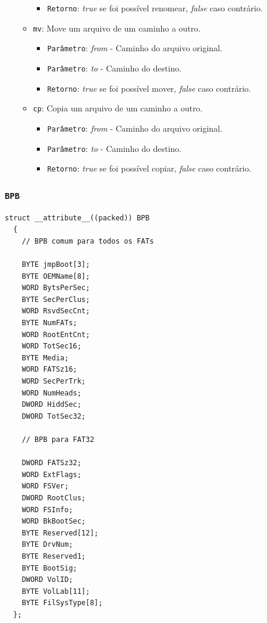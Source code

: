 \documentclass[
    12pt,				%
    oneside,   	        %
    a4paper,			%
    english,			%
    french,				%
    spanish,			%
    brazil,				%
    ]{pacotes/abntex2}
\begin{document}
\begin{itemize}
\begin{itemize}
\begin{itemize}
                \item \texttt{Retorno}: \textit{true} se foi possível renomear, \textit{false} caso contrário.
            \end{itemize}
            \item \texttt{mv}: Move um arquivo de um caminho a outro.
            \begin{itemize}
                \item \texttt{Parâmetro}: \textit{from} - Caminho do arquivo original.
                \item \texttt{Parâmetro}: \textit{to} - Caminho do destino.
                \item \texttt{Retorno}: \textit{true} se foi possível mover, \textit{false} caso contrário.
            \end{itemize}
            \item \texttt{cp}: Copia um arquivo de um caminho a outro.
            \begin{itemize}
                \item \texttt{Parâmetro}: \textit{from} - Caminho do arquivo original.
                \item \texttt{Parâmetro}: \textit{to} - Caminho do destino.
                \item \texttt{Retorno}: \textit{true} se foi possível copiar, \textit{false} caso contrário.
            \end{itemize}
        \end{itemize}
\end{itemize}


\subsubsection{\texttt{BPB}}
\label{subsubsec:bpb}

\begin{lstlisting}[caption={Estrutura que representa o BPB encontrado no volume FAT}, label={lst:bpb}]
  struct __attribute__((packed)) BPB
  {
    // BPB comum para todos os FATs
    
    BYTE jmpBoot[3];
    BYTE OEMName[8];
    WORD BytsPerSec;
    BYTE SecPerClus;
    WORD RsvdSecCnt;
    BYTE NumFATs;
    WORD RootEntCnt;
    WORD TotSec16;
    BYTE Media;
    WORD FATSz16;
    WORD SecPerTrk;
    WORD NumHeads;
    DWORD HiddSec;
    DWORD TotSec32;
    
    // BPB para FAT32

    DWORD FATSz32;
    WORD ExtFlags;
    WORD FSVer;
    DWORD RootClus;
    WORD FSInfo;
    WORD BkBootSec;
    BYTE Reserved[12];
    BYTE DrvNum;
    BYTE Reserved1;
    BYTE BootSig;
    DWORD VolID;
    BYTE VolLab[11];
    BYTE FilSysType[8];
  };
\end{lstlisting}
\end{document}
